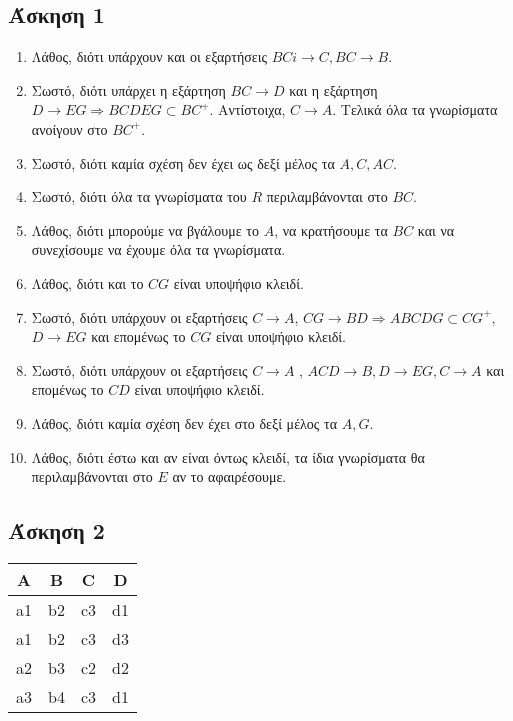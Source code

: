 \documentclass{assignment}
\begin{document}
\maketitle
\subsection*{Άσκηση 1}
\begin{enumerate}[(1)]
\item Λάθος, διότι υπάρχουν και οι εξαρτήσεις $BCi\rightarrow C, BC\rightarrow B$.
\item Σωστό, διότι υπάρχει η εξάρτηση $BC\rightarrow D$ και η εξάρτηση $D\rightarrow EG \Rightarrow  BCDEG\subset BC^{+}$. Αντίστοιχα, $C\rightarrow A$. Τελικά όλα τα γνωρίσματα ανοίγουν στο $BC^{+}$.
\item Σωστό, διότι καμία σχέση δεν έχει ως δεξί μέλος τα $A,C,AC$.
\item Σωστό, διότι όλα τα γνωρίσματα του $R$ περιλαμβάνονται στο $BC$.
\item Λάθος, διότι μπορούμε να βγάλουμε το $A$, να κρατήσουμε τα $BC$ και να συνεχίσουμε να έχουμε όλα τα γνωρίσματα.
\item Λάθος, διότι και το $CG$ είναι υποψήφιο κλειδί.
\item Σωστό, διότι υπάρχουν οι εξαρτήσεις $C\rightarrow A$, $CG\rightarrow BD  \Rightarrow  ABCDG\subset CG^{+}$, $D\rightarrow EG$ και επομένως το $CG$ είναι υποψήφιο κλειδί.
\item Σωστό, διότι υπάρχουν οι εξαρτήσεις $C\rightarrow A$ , $ACD\rightarrow B , D\rightarrow EG , C\rightarrow A$ και επομένως το $CD$ είναι υποψήφιο κλειδί.
\item Λάθος, διότι καμία σχέση δεν έχει στο δεξί μέλος τα $A,G$.
\item Λάθος, διότι έστω και αν είναι όντως κλειδί, τα ίδια γνωρίσματα θα περιλαμβάνονται στο $E$ αν το αφαιρέσουμε. 
\end{enumerate}

\newpage
\subsection*{Άσκηση 2}


\begin{center}
\begin{tabular}{|c|c|c|c|}
    \hline
    A & B & C & D \\ \hline
    a1 & b2 & c3 & d1 \\ \hline
    a1 & b2 & c3 & d3 \\ \hline
    a2 & b3 & c2 & d2 \\ \hline
    a3 & b4 & c3 & d1 \\ \hline
\end{tabular}
\end{center}
\end{document}
